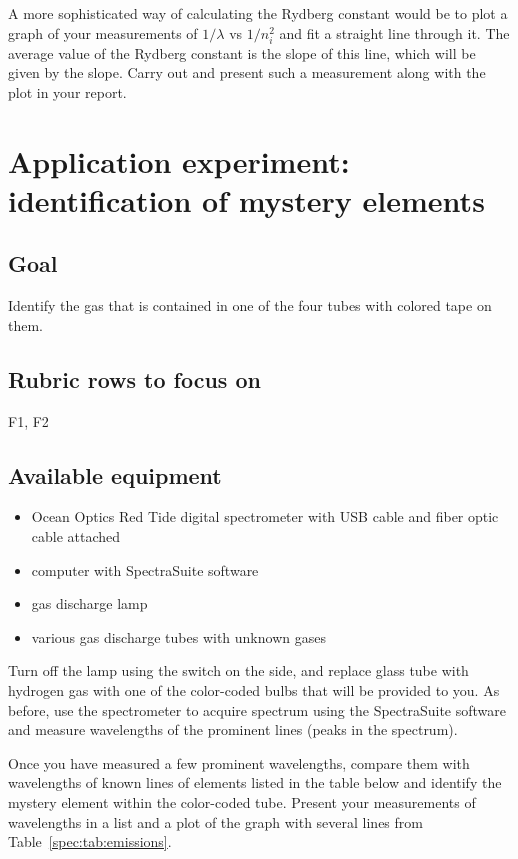 A more sophisticated way of calculating the Rydberg constant would be to plot a graph of
your measurements of $1/\lambda$ vs $1/n_i^2$ and fit a straight line through it. The
average value of the Rydberg constant is the slope of this line, which will be given by the
slope. Carry out and present such a measurement along with the plot in your report.

\section{Application experiment: identification of mystery elements}

\subsection{Goal}

Identify the gas that is contained in one of the four tubes with colored tape on them.

\subsection{Rubric rows to focus on}

F1, F2

\subsection{Available equipment}

\begin{itemize}
	\item Ocean Optics Red Tide digital spectrometer with USB cable and fiber optic cable attached
	
	\item computer with SpectraSuite software
	
	\item gas discharge lamp
	
	\item various gas discharge tubes with unknown gases
\end{itemize}

Turn off the lamp using the switch on the side, and replace glass tube with hydrogen gas
with one of the color-coded bulbs that will be provided to you. As before, use the
spectrometer to acquire spectrum using the SpectraSuite software and measure
wavelengths of the prominent lines (peaks in the spectrum).

Once you have measured a few prominent wavelengths, compare them with wavelengths
of known lines of elements listed in the table below and identify the mystery element
within the color-coded tube. Present your measurements of wavelengths in a list and a
plot of the graph with several lines from Table~\ref{spec:tab:emissions}.

